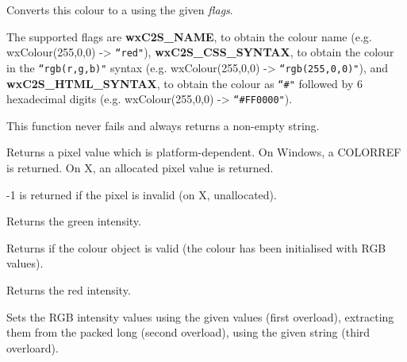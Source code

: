 Converts this colour to a 
using the given {\it flags}.

The supported flags are {\bf wxC2S\_NAME}, to obtain the colour
name (e.g. wxColour(255,0,0) -> \texttt{``red"}), {\bf wxC2S\_CSS\_SYNTAX}, to obtain
the colour in the \texttt{``rgb(r,g,b)"} syntax
(e.g. wxColour(255,0,0) -> \texttt{``rgb(255,0,0)"}), and {\bf wxC2S\_HTML\_SYNTAX}, to obtain
the colour as  \texttt{``\#"} followed by 6 hexadecimal digits
(e.g. wxColour(255,0,0) -> \texttt{``\#FF0000"}).

This function never fails and always returns a non-empty string.


\label{wxcolourgetpixel}


Returns a pixel value which is platform-dependent. On Windows, a COLORREF is returned.
On X, an allocated pixel value is returned.

-1 is returned if the pixel is invalid (on X, unallocated).


\label{wxcolourgreen}


Returns the green intensity.


\label{wxcolourok}


Returns \true if the colour object is valid (the colour has been initialised with RGB values).


\label{wxcolourred}


Returns the red intensity.


\label{wxcolourset}




Sets the RGB intensity values using the given values (first overload), extracting them from the packed long (second overload), using the given string (third overloard).

